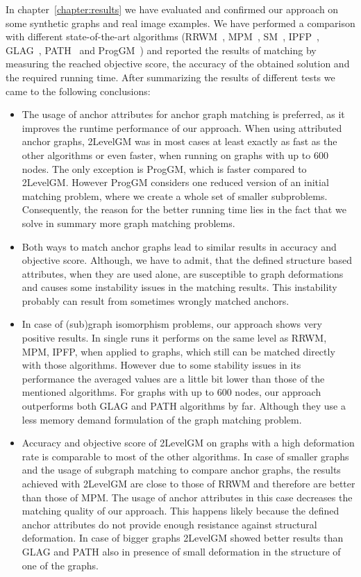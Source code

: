 In chapter~\ref{chapter:results} we have evaluated and confirmed our approach on some synthetic graphs and real image examples. We have performed a comparison with different state-of-the-art algorithms (RRWM~\cite{Cho2010_RRWM}, MPM~\cite{Cho2014_Haystack}, SM~\cite{Leordeanu2005_SM}, IPFP~\cite{Leordeanu2009_IPFP}, GLAG~\cite{Fiori2013_GLAG}, PATH~\cite{Zazlavskiy2008_PATH} and ProgGM~\cite{Cho2012_ProgressiveGM}) and reported the results of matching by measuring the reached objective score, the accuracy of the obtained solution and the required running time. After summarizing the results of different tests we came to the following conclusions:
\begin{itemize}
\item The usage of anchor attributes for anchor graph matching is preferred, as it improves the runtime performance of our approach. 
When using attributed anchor graphs, 2LevelGM was in most cases at least exactly as fast as the other algorithms or even faster, when running on graphs with up to $600$ nodes. The only exception is ProgGM, which is faster compared to 2LevelGM. However ProgGM considers one reduced version of an initial matching problem, where we create a whole set of smaller subproblems. Consequently, the reason for the better running time lies in the fact that we solve in summary more graph matching problems.
\item Both ways to match anchor graphs lead to similar results in accuracy and objective score. Although, we have to admit, that the defined structure based attributes, when they are used alone, are susceptible to graph deformations and causes some instability issues in the matching results. This instability probably can result from sometimes wrongly matched anchors.
\item In case of (sub)graph isomorphism problems, our approach shows very positive results. In single runs it performs on the same level as RRWM, MPM, IPFP, when applied to graphs, which still can be matched directly with those algorithms. However due to some stability issues in its performance the averaged values are a little bit lower than those of the mentioned algorithms. For graphs with up to $600$ nodes, our approach outperforms both GLAG and PATH algorithms by far. Although they use a less memory demand formulation of the graph matching problem.
\item Accuracy and objective score of 2LevelGM on graphs with a high deformation rate is comparable to most of the other algorithms. In case of smaller graphs and the usage of subgraph matching to compare anchor graphs, the results achieved with 2LevelGM are close to those of RRWM and therefore are better than those of MPM. The usage of anchor attributes in this case decreases the matching quality of our approach.  This happens likely because the defined anchor attributes do not provide enough resistance against structural deformation. In case of bigger graphs 2LevelGM showed better results than GLAG and PATH also in presence of small deformation in the structure of one of the graphs.

\end{itemize}
